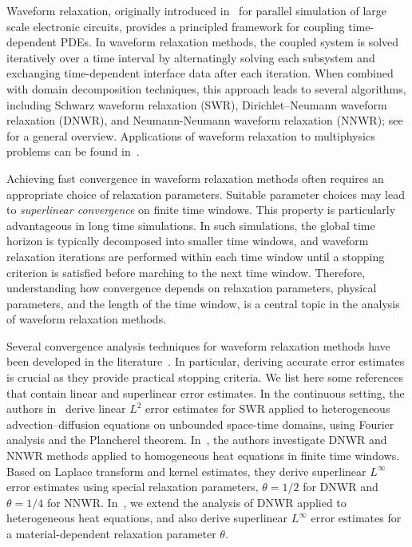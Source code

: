 \documentclass[reqno]{amsart}
\begin{document}
Waveform relaxation, originally introduced in~\cite{lelarasmee1982} for parallel simulation of large scale electronic circuits, provides a principled framework for coupling time-dependent PDEs. In waveform relaxation methods, the coupled system is solved iteratively over a time interval by alternatingly solving each subsystem and exchanging time-dependent interface data after each iteration. When combined with domain decomposition techniques, this approach leads to several algorithms, including Schwarz waveform relaxation (SWR), Dirichlet--Neumann waveform relaxation (DNWR), and Neumann-Neumann waveform relaxation (NNWR); see~\cite[Chapter 3]{waveformBook} for a general overview. Applications of waveform relaxation to multiphysics problems can be found in~\cite{clement2022, meimonbir:23, monbir:18, rodenberg2025}. 

Achieving fast convergence in waveform relaxation methods often requires an appropriate choice of relaxation parameters. Suitable parameter choices may lead to {\sl superlinear convergence} on finite time windows. This property is particularly advantageous in long time simulations. In such simulations, the global time horizon is typically decomposed into smaller time windows, and waveform relaxation iterations are performed within each time window until a stopping criterion is satisfied before marching to the next time window. Therefore, understanding how convergence depends on relaxation parameters, physical parameters, and the length of the time window, is a central topic in the analysis of waveform relaxation methods.

Several convergence analysis techniques for waveform relaxation methods have been developed in the literature~\cite{arnoult2023, clement2022, engstrom2024, gander2007, haynes2020, ledebl:13, monbir:18}. In particular, deriving accurate error estimates is crucial as they provide practical stopping criteria. We list here some references that contain linear and superlinear error estimates. In the continuous setting, the authors in~\cite{ledebl:13} derive linear $L^2$ error estimates for SWR applied to heterogeneous advection--diffusion equations on unbounded space-time domains, using Fourier analysis and the Plancherel theorem. In~\cite{gakwma:16}, the authors investigate DNWR and NNWR methods applied to homogeneous heat equations in finite time windows. Based on Laplace transform and kernel estimates, they derive superlinear $L^{\infty}$ error estimates using special relaxation parameters, $\theta=1/2$ for DNWR and $\theta=1/4$ for NNWR. In~\cite{DD28}, we extend the analysis of DNWR applied to heterogeneous heat equations, and also derive superlinear $L^{\infty}$ error estimates for a material-dependent relaxation parameter $\theta$. 
\end{document}
